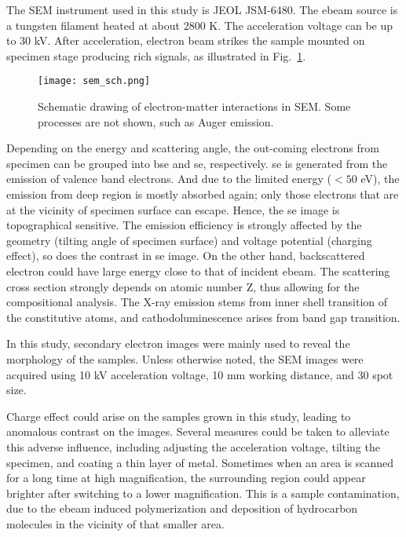 The SEM instrument used in this study is JEOL JSM-6480. The \gls{ebeam} source is a tungsten filament heated at about 2800 K.\cite{jeolsem} The acceleration voltage can be up to 30 kV. After acceleration, electron beam strikes the sample mounted on specimen stage producing rich signals, as illustrated in Fig.~\ref{fig:ch2sem}. 
\begin{figure}[htb]
\centering
\texttt{[image: sem\_sch.png]}
\caption[Schematic drawing of electron-matter interactions in SEM]{Schematic drawing of electron-matter interactions in SEM.\cite{Good2000} Some processes are not shown, such as Auger emission.}
\label{fig:ch2sem}
\end{figure}
Depending on the energy and scattering angle, the out-coming electrons from specimen can be grouped into \gls{bse} and \gls{se}, respectively. \gls{se} is generated from the emission of valence band electrons. And due to the limited energy ($<50$ eV), the emission from deep region is mostly absorbed again; only those electrons that are at the vicinity of specimen surface can escape. Hence, the \gls{se} image is topographical sensitive. The emission efficiency is strongly affected by the geometry (tilting angle of specimen surface) and voltage potential (charging effect), so does the contrast in \gls{se} image. On the other hand, backscattered electron could have large energy close to that of incident \gls{ebeam}. The scattering cross section strongly depends on atomic number Z, thus allowing for the compositional analysis. The X-ray emission stems from inner shell transition of the constitutive atoms, and cathodoluminescence arises from band gap transition. 

In this study, secondary electron images were mainly used to reveal the morphology of the samples. Unless otherwise noted, the SEM images were acquired using 10 kV acceleration voltage, 10 mm working distance, and 30 spot size.

Charge effect could arise on the samples grown in this study, leading to anomalous contrast on the images. Several measures could be taken to alleviate this adverse influence, including adjusting the acceleration voltage, tilting the specimen, and coating a thin layer of metal. Sometimes when an area is scanned for a long time at high magnification, the surrounding region could appear brighter after switching to a lower magnification. This is a sample contamination, due to the \gls{ebeam} induced polymerization and deposition of hydrocarbon molecules in the vicinity of that smaller area. 

